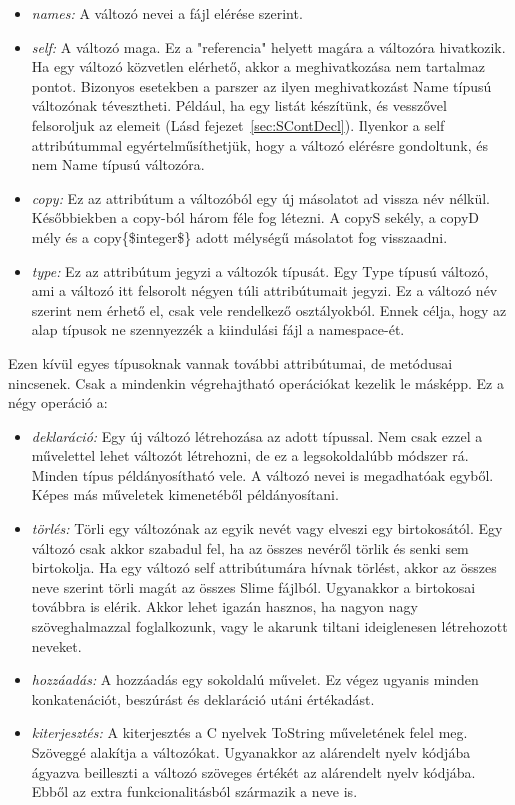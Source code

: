 \begin{itemize}
\item \emph{names:} 
A változó nevei a fájl elérése szerint.
\item \emph{self:} 
A változó maga. 
Ez a "referencia" helyett magára a változóra hivatkozik.
Ha egy változó közvetlen elérhető, akkor a meghivatkozása nem tartalmaz pontot.
Bizonyos esetekben a parszer az ilyen meghivatkozást Name típusú változónak tévesztheti.
Például, ha egy listát készítünk, és vesszővel felsoroljuk az elemeit (Lásd fejezet~\ref{sec:SContDecl}).
Ilyenkor a self attribútummal egyértelműsíthetjük, hogy a változó elérésre gondoltunk, és nem Name típusú változóra. 
\item \emph{copy:}
Ez az attribútum a változóból egy új másolatot ad vissza név nélkül.
Későbbiekben a copy-ból három féle fog létezni. 
A copyS sekély, a copyD mély és a copy\{\$integer\$\} adott mélységű másolatot fog visszaadni.
\item \emph{type:}
Ez az attribútum jegyzi a változók típusát.
Egy Type típusú változó, ami a változó itt felsorolt négyen túli attribútumait jegyzi.
Ez a változó név szerint nem érhető el, csak vele rendelkező osztályokból.
Ennek célja, hogy az alap típusok ne szennyezzék a kiindulási fájl a namespace-ét.
\end{itemize}

Ezen kívül egyes típusoknak vannak további attribútumai, de metódusai nincsenek. 
Csak a mindenkin végrehajtható operációkat kezelik le másképp. 
Ez a négy operáció a:
\begin{itemize}
\item \emph{deklaráció:} 
Egy új változó létrehozása az adott típussal.
Nem csak ezzel a művelettel lehet változót létrehozni, de ez a legsokoldalúbb módszer rá.
Minden típus példányosítható vele.
A változó nevei is megadhatóak egyből.
Képes más műveletek kimenetéből példányosítani.
\item \emph{törlés:} 
Törli egy változónak az egyik nevét vagy elveszi egy birtokosától.
Egy változó csak akkor szabadul fel, ha az összes nevéről törlik és senki sem birtokolja.
Ha egy változó self attribútumára hívnak törlést, akkor az összes neve szerint törli magát az összes Slime fájlból.
Ugyanakkor a birtokosai továbbra is elérik.
Akkor lehet igazán hasznos, ha nagyon nagy szöveghalmazzal foglalkozunk, vagy le akarunk tiltani ideiglenesen létrehozott neveket.
\item \emph{hozzáadás:}
A hozzáadás egy sokoldalú művelet. 
Ez végez ugyanis minden konkatenációt, beszúrást és deklaráció utáni értékadást.
\item \emph{kiterjesztés:}
A kiterjesztés a C nyelvek ToString műveletének felel meg. 
Szöveggé alakítja a változókat.
Ugyanakkor az alárendelt nyelv kódjába ágyazva beilleszti a változó szöveges értékét az alárendelt nyelv kódjába. 
Ebből az extra funkcionalitásból származik a neve is.
\end{itemize}


